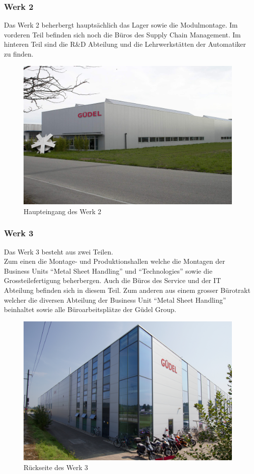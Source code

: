 \subsubsection{Werk 2}
Das Werk 2 beherbergt hauptsächlich das Lager sowie die Modulmontage. Im
vorderen Teil befinden sich noch die Büros des Supply Chain Management. Im
hinteren Teil sind die R\&D Abteilung und die Lehrwerkstätten der Automatiker zu
finden.
\begin{figure}[ht]
    \centering
    \includegraphics[scale=0.15]{werk_2.jpg}
    \caption{Haupteingang des Werk 2}
\end{figure}

\subsubsection{Werk 3}
Das Werk 3 besteht aus zwei Teilen.\\
Zum einen die Montage- und Produktionshallen
welche die Montagen der Business Units ``Metal Sheet Handling'' und 
``Technologies'' sowie die Grossteilefertigung beherbergen. 
Auch die Büros des Service und der IT Abteilung befinden sich in diesem Teil.
\newpage
Zum anderen aus einem grosser Bürotrakt welcher die diversen Abteilung der Business
Unit ``Metal Sheet Handling'' beinhaltet sowie alle Büroarbeitsplätze der Güdel
Group.
\begin{figure}[ht]
    \centering
    \includegraphics[scale=0.25]{werk_3.jpg}
    \caption{Rückseite des Werk 3}
\end{figure}
